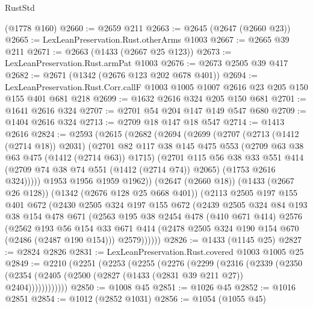 \begin{lexlean}{RustStd}
\begin{coremodule}
    (@1778 @160)
@2660 := @2659 @211
@2663 := @2645 (@2647 (@2660 @23))
@2665 := LexLeanPreservation.Rust.otherArms @1003
@2667 := @2665 @39 @211
@2671 := @2663 (@1433 (@2667 @25 @123))
@2673 := LexLeanPreservation.Rust.armPat @1003
@2676 := @2673 @2505 @39 @417
@2682 := @2671 (@1342 (@2676 @123 @202 @678 @401))
@2694 := LexLeanPreservation.Rust.Corr.callF
    @1003
    @1005
    @1007
    @2616
    @23
    @205
    @150
    @155
    @401
    @681
    @218
@2699 := @1632 @2616 @324 @205 @150 @681
@2701 := @1641 @2616 @324
@2707 := @2701 @54 @204 @147 @149 @547 @680
@2709 := @1404 @2616 @324
@2713 := @2709 @18 @147 @18 @547
@2714 := @1413 @2616
@2824 := @2593
    (@2615
      (@2682
        (@2694
          (@2699
            (@2707
              (@2713 (@1412 (@2714 @18)) @2031)
              (@2701
                @82
                @117
                @38
                @145
                @475
                @553
                (@2709 @63 @38 @63 @475 (@1412 (@2714 @63)) @1715)
                (@2701
                  @115
                  @56
                  @38
                  @33
                  @551
                  @414
                  (@2709 @74 @38 @74 @551 (@1412 (@2714 @74)) @2065)
                  (@1753 @2616 @324)))))
          @1953
          @1956
          @1959
          @1962))
      (@2647 (@2660 @18))
      (@1433 (@2667 @26 @128))
      (@1342 (@2676 @128 @25 @668 @401))
      (@2113
        @2505
        @197
        @155
        @401
        @672
        (@2430
          @2505
          @324
          @197
          @155
          @672
          (@2439
            @2505
            @324
            @84
            @193
            @38
            @154
            @478
            @671
            (@2563
              @195
              @38
              @2454
              @478
              (@410 @671 @414)
              @2576
              (@2562
                @193
                @56
                @154
                @33
                @671
                @414
                (@2478 @2505 @324 @190 @154 @670 (@2486 (@2487 @190 @154)))
                @2579))))))
@2826 := @1433 (@1145 @25)
@2827 := @2824 @2826
@2831 := LexLeanPreservation.Rust.covered @1003 @1005 @25
@2849 := @2210
    (@2251
      (@2253
        (@2255
          (@2276
            (@2299
              (@2316
                (@2339
                  (@2350 (@2354 (@2405 (@2500 (@2827 (@1433 (@2831 @39 @211 @27)) @2404))))))))))))
@2850 := @1008 @45
@2851 := @1026 @45
@2852 := @1016 @2851
@2854 := @1012 (@2852 @1031)
@2856 := @1054 (@1055 @45)

\end{coremodule}
\end{lexlean}
